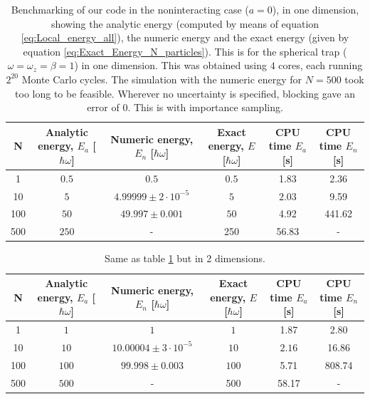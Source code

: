 \documentclass[a4paper, 10pt]{article}
\begin{document}
		 \begin{table}[ht!]
		 	\caption{Benchmarking of our code in the noninteracting case ($a=0$), in one dimension, showing the analytic energy (computed by means of equation \ref{eq:Local_energy_all}), the numeric energy and the exact energy (given by equation \ref{eq:Exact_Energy_N_particles}). This is for the spherical trap ($\omega=\omega_z=\beta=1$) in one dimension. This was obtained using $4$ cores, each running $2^{20}$ Monte Carlo cycles. The simulation with the numeric energy for $N=500$ took too long to be feasible. Wherever no uncertainty is specified, blocking gave an error of $0$. This is with importance sampling.}\label{tab:4.1_benchmark_Green}
			\begin{adjustwidth}{-2cm}{}
				\begin{tabular}{cccccc}
					N & Analytic energy, $E_a$ [$\hbar \omega$] & Numeric energy, $E_n$ [$\hbar \omega$] & Exact energy, $E$ [$\hbar \omega$]& CPU time $E_a$ [s] &CPU time $E_n$ [s]\\
					\hline
					1&$0.5$&$0.5$&$0.5$& 1.83&2.36\\
					10&$5$&$4.99999\pm 2\cdot 10^{-5}$&$5$& $2.03$&9.59\\
					100&$50$&$49.997\pm 0.001$&$50$&4.92&441.62\\
					500&$250$&-&250 &56.83 &-
				\end{tabular}
			\end{adjustwidth}
		\end{table}
		 \begin{table}[ht!]
			 \caption{Same as table \ref{tab:4.1_benchmark_Green} but in 2 dimensions.}\label{tab:4.1_benchmark_Green_2D}
		 	\begin{adjustwidth}{-2cm}{}
		 		\begin{tabular}{cccccc}
		 			N & Analytic energy, $E_a$ [$\hbar \omega$] & Numeric energy, $E_n$ [$\hbar \omega$] & Exact energy, $E$ [$\hbar \omega$]& CPU time $E_a$ [s] &CPU time $E_n$ [s]\\
		 			\hline
		 			1&$1$&$1$&$1$& 1.87&2.80\\
		 			10&$10$&$10.00004\pm 3\cdot 10^{-5}$&$10$& $2.16$&16.86\\
		 			100&$100$&$99.998\pm 0.003$&$100$&5.71&808.74\\
		 			500&$500$&-&500 &58.17 &-
		 		\end{tabular}
		 	\end{adjustwidth}
		 \end{table}
\end{document}
